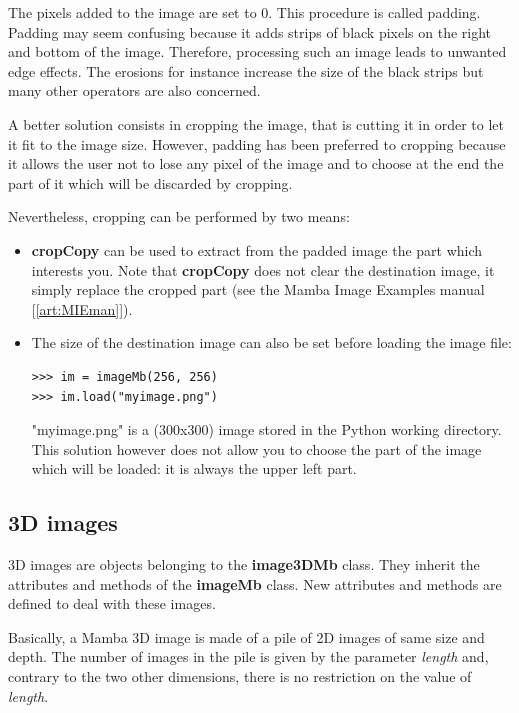\documentclass[a4paper,10pt,oneside]{article}
\begin{document}
The pixels added to the image are set to 0. This procedure is called padding. Padding may seem confusing
because it adds strips of black pixels on the right and bottom of the image. Therefore, processing such an
image leads to unwanted edge effects. The erosions for instance increase the size of the black strips
but many other operators are also concerned.

A better solution consists in cropping the image, that is cutting it in order to let it fit to the image size.
However, padding has been preferred to cropping because it allows the user not to lose any pixel of the image
and to choose at the end the part of it which will be discarded by cropping.

Nevertheless, cropping can be performed by two means:

\begin{itemize}
\item \textbf{cropCopy} can be used to extract from the padded image the part which interests you. Note that
\textbf{cropCopy} does not clear the destination image, it simply replace the cropped part (see the Mamba
Image Examples manual [\ref{art:MIEman}]).
\item The size of the destination image can also be set before loading the image file:

\lstset{language=Python}
\begin{lstlisting}
>>> im = imageMb(256, 256)
>>> im.load("myimage.png")
\end{lstlisting}

"myimage.png" is a (300x300) image stored in the Python working directory. This solution however does not allow you
to choose the part of the image which will be loaded: it is always the upper left part.
\end{itemize}

\subsection{3D images}
3D images are objects belonging to the \textbf{image3DMb} class. They inherit the attributes and methods of the
\textbf{imageMb} class. New attributes and methods are defined to deal with these images.

Basically, a Mamba 3D image is made of a pile of 2D images of same size and depth. The number of images in
the pile is given by the parameter \textit{length} and, contrary to the two other dimensions, there is no restriction
on the value of \textit{length}.
\end{document}
